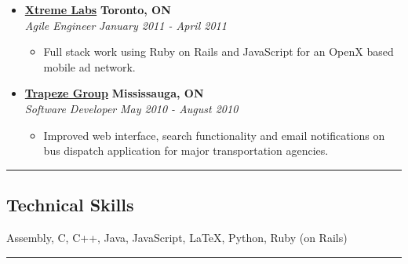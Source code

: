 \documentclass[10pt,letterpaper]{article}
\begin{document}
\begin{itemize}
    \item[]
    {\href{http://www.xtremelabs.com/}{\textbf{Xtreme Labs}} \hfill
      \textbf{Toronto, ON}}
    \\
    {\emph{Agile Engineer} \hfill \emph{January 2011 - April 2011}}

    \begin{itemize}[label=\textbullet]
      \itemsep0em
      \item Full stack work using Ruby on Rails and JavaScript for an OpenX
        based mobile ad network.
    \end{itemize}

    \item[]
    {\href{http://www.trapezegroup.com/}{\textbf{Trapeze Group}} \hfill
      \textbf{Mississauga, ON}}
    \\
    {\emph{Software Developer} \hfill \emph{May 2010 - August 2010}}

    \begin{itemize}[label=\textbullet]
      \itemsep0em
      \item Improved web interface, search functionality and email notifications
        on bus dispatch application for major transportation agencies.
    \end{itemize}
  \end{itemize}


\hrule
\vspace{-0.4em}
\subsection*{Technical Skills}
\begin{description}[labelindent=\parindent]
  \item[Languages:]
  Assembly, C, C++, Java, JavaScript, \LaTeX, Python, Ruby (on Rails)
\end{description}

\hrule
\vspace{-0.4em}
\end{document}
